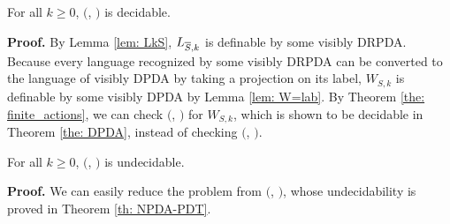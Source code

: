 \begin{theorem}
For all $k\geq 0$, \Real $($\DRPDAv, \RPDTk$)$ is decidable.
\end{theorem}
{\bf Proof.}\quad
By Lemma \ref{lem: LkS}, $L_{{\overline{S}},k}$ is definable by some visibly DRPDA.
Because every language recognized by some visibly DRPDA can be converted to
the language of visibly DPDA by taking a projection on its label,
$W_{S,k}$ is definable by some visibly DPDA by Lemma \ref{lem: W=lab}.
By Theorem \ref{the: finite_actions}, we can check \Real $($\DPDA, \PDT$)$ for $W_{S,k}$, which is shown to be decidable in Theorem \ref{the: DPDA}, instead of checking \Real $($\DRPDAv, \RPDTk$)$.

\begin{theorem}
For all $k\geq 0$, \Real $($\NRPDA, \RPDTk$)$ is undecidable.
\end{theorem}
{\bf Proof.}\quad
We can easily reduce the problem from \Real $($\NPDA, \PDT$)$,
whose undecidability is proved in Theorem \ref{th: NPDA-PDT}.


